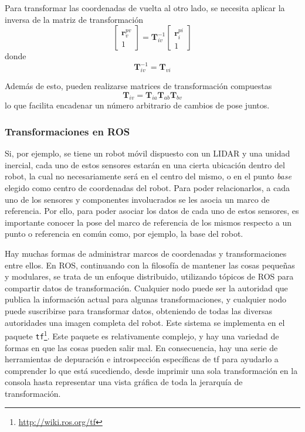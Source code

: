Para transformar las coordenadas de vuelta al otro lado, se necesita aplicar la inversa de la matriz de transformación
\begin{equation}
    \begin{bmatrix}
        \bm{r}_v^{pv} \\
        1
    \end{bmatrix}
    =
    \bm{T}_{iv}^{-1}
    \begin{bmatrix}
        \bm{r}_i^{pi} \\
        1
    \end{bmatrix}
\end{equation}
donde
\begin{equation}
    \bm{T}_{iv}^{-1} = \bm{T}_{vi}
\end{equation}

Además de esto, pueden realizarse matrices de transformación compuestas
\begin{equation}
    \bm{T}_{iv} = \bm{T}_{ia}\bm{T}_{ab}\bm{T}_{bv}
\end{equation}
lo que facilita encadenar un número arbitrario de cambios de pose juntos.

\subsubsection{Transformaciones en ROS}
Si, por ejemplo, se tiene un robot móvil dispuesto con un LIDAR y una unidad inercial, cada uno de estos sensores estarán en una cierta ubicación dentro del robot, la cual no necesariamente será en el centro del mismo, o en el punto \textit{base} elegido como centro de coordenadas del robot. Para poder relacionarlos, a cada uno de los sensores y componentes involucrados se les asocia un marco de referencia. Por ello, para poder asociar los datos de cada uno de estos sensores, es importante conocer la pose del marco de referencia de los mismos respecto a un punto o referencia en común como, por ejemplo, la base del robot.

Hay muchas formas de administrar marcos de coordenadas y transformaciones entre ellos. En ROS, continuando con la filosofía de mantener las cosas pequeñas y modulares, se trata de un enfoque distribuido, utilizando tópicos de ROS para compartir datos de transformación. Cualquier nodo puede ser la autoridad que publica la información actual para algunas transformaciones, y cualquier nodo puede suscribirse para transformar datos, obteniendo de todas las diversas autoridades una imagen completa del robot. Este sistema se implementa en el paquete \texttt{tf}\footnote{\url{http://wiki.ros.org/tf}}. Este paquete es relativamente complejo, y hay una variedad de formas en que las cosas pueden salir mal. En consecuencia, hay una serie de herramientas de depuración e introspección específicas de tf para ayudarlo a comprender lo que está sucediendo, desde imprimir una sola transformación en la consola hasta representar una vista gráfica de toda la jerarquía de transformación.

